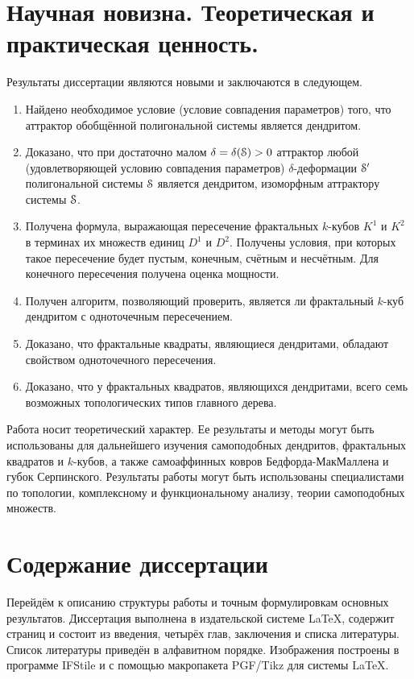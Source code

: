 \section{Научная новизна. Теоретическая и практическая ценность.}
Результаты диссертации являются новыми и заключаются в следующем.
\begin{enumerate}
\item Найдено необходимое условие (условие совпадения параметров) того, что аттрактор обобщённой полигональной системы является дендритом. 

\item Доказано, что при достаточно малом $\delta=\delta({\EuScript S})>0$ аттрактор любой (удовлетворяющей условию совпадения параметров) $\delta$-деформации ${\EuScript S}'$  полигональной системы ${\EuScript S}$ является дендритом, изоморфным аттрактору системы ${\EuScript S}$.

\item Получена формула, выражающая пересечение фрактальных $k$-кубов $K^1$ и $K^2$ в терминах их множеств единиц $D^1$ и $D^2$.
Получены условия, при которых такое пересечение будет пустым, конечным, счётным и несчётным.
Для конечного пересечения получена оценка мощности.

\item Получен алгоритм, позволяющий проверить, является ли фрактальный $k$-куб дендритом с одноточечным пересечением.

\item Доказано, что фрактальные квадраты, являющиеся дендритами, обладают свойством одноточечного пересечения.

\item Доказано, что у фрактальных квадратов, являющихся дендритами, всего семь возможных топологических типов главного дерева.
\end{enumerate}

Работа носит теоретический характер. 
Ее результаты и методы могут быть использованы для дальнейшего изучения самоподобных дендритов, фрактальных квадратов и $k$-кубов, а также самоаффинных ковров Бедфорда-МакМаллена и губок Серпинского. 
Результаты работы могут быть использованы специалистами по топологии, комплексному и функциональному анализу, теории самоподобных множеств.

\section{Содержание диссертации}

Перейдём к описанию структуры работы и точным формулировкам основных результатов.
Диссертация выполнена в издательской системе \LaTeX, содержит \red{\pageref{LastPage}} страниц и состоит из введения, четырёх глав, заключения и списка литературы.
Список литературы приведён в алфавитном порядке.
Изображения построены в программе IFStile \cite{IFStile} и с помощью макропакета PGF/Tikz для системы \LaTeX.\\



